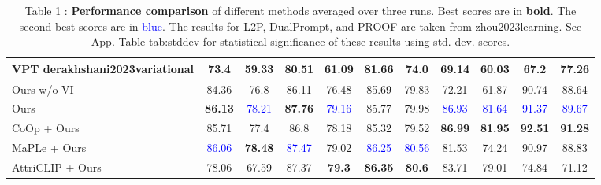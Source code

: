 \documentclass[varwidth=598pt]{standalone}
\begin{document}
\begin{table}
\begin{adjustbox}{max width=\textwidth}
\begin{tabular}{lcccccccccc}
VPT derakhshani2023variational & 73.4 & 59.33 & 80.51 & 61.09 & 81.66 & 74.0 & 69.14 & 60.03 & 67.2 & 77.26 \\
\midrule
Ours w/o VI & 84.36 & 76.8 & 86.11 & 76.48 & 85.69 & 79.83 & 72.21 & 61.87 & 90.74 & 88.64   \\  
\midrule
Ours  & \textbf{86.13} & \textcolor{blue}{78.21} & \textbf{87.76}  & \textcolor{blue}{79.16} & 85.77 & 79.98 & \textcolor{blue}{86.93} & \textcolor{blue}{81.64}  & \textcolor{blue}{91.37} & \textcolor{blue}{89.67} \\
CoOp + Ours  & 85.71  & 77.4 & 86.8& 78.18& 85.32 & 79.52  & \textbf{86.99} & \textbf{81.95} & \textbf{92.51} & \textbf{91.28}  \\
MaPLe + Ours & \textcolor{blue}{86.06} & \textbf{78.48} & \textcolor{blue}{87.47} & 79.02 & \textcolor{blue}{86.25} & \textcolor{blue}{80.56} & 81.53 & 74.24 & 90.97 & 88.83 \\
AttriCLIP + Ours  & 78.06 & 67.59 &  87.37 & \textbf{79.3} & \textbf{86.35} & \textbf{80.6}  & 83.71 & 79.01 & 74.84 & 71.12 \\
\bottomrule
\end{tabular}
\end{adjustbox}
\caption{Table 1 : \textbf{Performance comparison} of different methods averaged over three runs. Best scores are in \textbf{bold}. The second-best scores are in \textcolor{blue}{blue}. The results for L2P, DualPrompt, and PROOF are taken from zhou2023learning. See App. Table tab:stddev for statistical significance of these results using std. dev. scores.}
\end{table}
\end{document}
